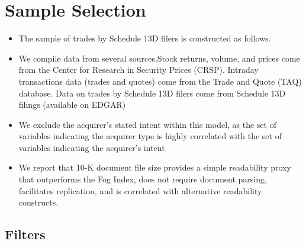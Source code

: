 \documentclass[12pt]{article}
\begin{document}
\section{Sample Selection}

    \begin{itemize}
        
        \item The sample of trades by Schedule 13D filers is constructed as follows.\citep{Collin-Dufresne2015}

        \item We compile data from several sources.Stock returns, volume, and prices come from the Center for Research in Security Prices (CRSP). Intraday transactions data (trades and quotes) come from the Trade and Quote (TAQ) database. Data on trades by Schedule 13D filers come from Schedule 13D filings (available on EDGAR) \citep{Collin-Dufresne2015}

        \item We exclude the acquirer’s stated intent within this model, as the set of variables indicating the acquirer type is highly correlated with the set of variables indicating the acquirer’s intent \citep{Brigida2012}

        \item We report that 10-K document file size provides a simple readability proxy that outperforms the Fog Index, does not require document parsing, facilitates replication, and is correlated with alternative readability constructs.\citep{Loughran2014}

    \end{itemize}

\subsection{Filters}
\end{document}
